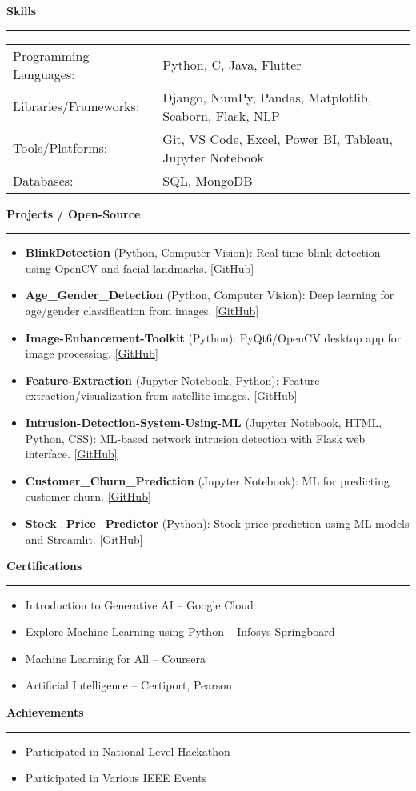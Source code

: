 \documentclass[a4paper]{article}
\newcommand{\resumesection}[1]{\vspace{8pt}\textbf{\large\color{blue}#1}\vspace{2pt}\hrule\vspace{4pt}}
\newenvironment{resumebullets}{\begin{itemize}[leftmargin=*,itemsep=2pt,topsep=2pt]}{\end{itemize}}
\begin{document}
\resumesection{Skills}
\begin{longtable}{p{4cm}p{12cm}}
Programming Languages: & Python, C, Java, Flutter \\
Libraries/Frameworks: & Django, NumPy, Pandas, Matplotlib, Seaborn, Flask, NLP \\
Tools/Platforms: & Git, VS Code, Excel, Power BI, Tableau, Jupyter Notebook \\
Databases: & SQL, MongoDB \\
\end{longtable}

\resumesection{Projects / Open-Source}
\begin{resumebullets}
  \item \textbf{BlinkDetection} (Python, Computer Vision): Real-time blink detection using OpenCV and facial landmarks. \href{https://github.com/SudoAnirudh/BlinkDetection}{[GitHub]}
  \item \textbf{Age\_Gender\_Detection} (Python, Computer Vision): Deep learning for age/gender classification from images. \href{https://github.com/SudoAnirudh/Age_Gender_Detection}{[GitHub]}
  \item \textbf{Image-Enhancement-Toolkit} (Python): PyQt6/OpenCV desktop app for image processing. \href{https://github.com/SudoAnirudh/Image-Enhancement-Toolkit}{[GitHub]}
  \item \textbf{Feature-Extraction} (Jupyter Notebook, Python): Feature extraction/visualization from satellite images. \href{https://github.com/SudoAnirudh/Feature-Extraction}{[GitHub]}
  \item \textbf{Intrusion-Detection-System-Using-ML} (Jupyter Notebook, HTML, Python, CSS): ML-based network intrusion detection with Flask web interface. \href{https://github.com/SudoAnirudh/Intrusion-Detection-System-Using-ML}{[GitHub]}
  \item \textbf{Customer\_Churn\_Prediction} (Jupyter Notebook): ML for predicting customer churn. \href{https://github.com/SudoAnirudh/Customer_Churn_Prediction}{[GitHub]}
  \item \textbf{Stock\_Price\_Predictor} (Python): Stock price prediction using ML models and Streamlit. \href{https://github.com/SudoAnirudh/Stock_Price_Predictor}{[GitHub]}
\end{resumebullets}

\resumesection{Certifications}
\begin{resumebullets}
  \item Introduction to Generative AI -- Google Cloud
  \item Explore Machine Learning using Python -- Infosys Springboard
  \item Machine Learning for All -- Coursera
  \item Artificial Intelligence -- Certiport, Pearson
\end{resumebullets}

\resumesection{Achievements}
\begin{resumebullets}
  \item Participated in National Level Hackathon
  \item Participated in Various IEEE Events
\end{resumebullets}
\end{document}
